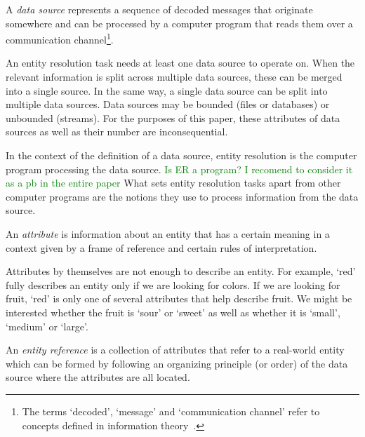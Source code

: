 \documentclass[journal]{IEEEtran}
\begin{document}
    \begin{defn}
        A \textit{data source} represents a sequence of decoded messages
        that originate somewhere and can be processed by a computer program that
        reads them over a communication channel\footnote{The terms `decoded', `message' and `communication channel' refer to concepts
        defined in information theory~\cite{ash2012it}.}.
    \end{defn}

    
    
    An entity resolution task needs at least one data source to operate on.
    When the relevant information is split across multiple data sources, these
    can be merged into a single source.
    In the same way, a single data source can be split into multiple data
    sources.
    Data sources may be bounded (files or databases) or unbounded (streams).
    For the purposes of this paper, these attributes of data sources as well as
    their number are inconsequential.
    
    In the context of the definition of a data source, entity resolution is the
    computer program processing the data source.
    \textcolor{green}{Is ER a program? I recomend to consider it as a pb in the entire paper} 
    What sets entity resolution tasks apart from other computer programs are the
    notions they use to process information from the data source.

    \begin{defn}
        An \textit{attribute} is information about an entity that has a certain
        meaning in a context given by a frame of reference and certain rules of
        interpretation.
    \end{defn}

    Attributes by themselves are not enough to describe an entity.
    For example, `red' fully describes an entity only if we are looking for
    colors.
    If we are looking for fruit, `red' is only one of several attributes that
    help describe fruit.
    We might be interested whether the fruit is `sour' or `sweet' as well as
    whether it is `small', `medium' or `large'.

    \begin{defn}
        An \textit{entity reference} is a collection of attributes that refer
        to a real-world entity which can be formed by following an organizing
        principle (or order) of the data source where the attributes are all
        located.
    \end{defn}
\end{document}
